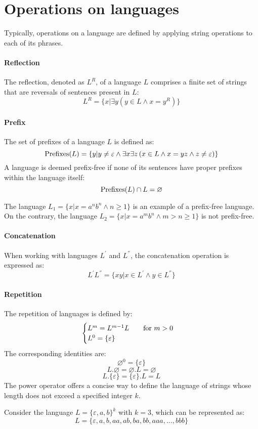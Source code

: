 \section{Operations on languages}

Typically, operations on a language are defined by applying string operations to each of its phrases.

\paragraph*{Reflection}
The reflection, denoted as $L^R$, of a language $L$ comprises a finite set of strings that are reversals of sentences present in $L$:
\[L^R = \{ x | \exists y \left( y \in L \land x=y^R \right)\}\]

\paragraph*{Prefix}  
The set of prefixes of a language $L$ is defined as:
\[\textnormal{Prefixes}(L)=\{y | y \neq \varepsilon \land \exists x \exists z \left( x \in L \land x=yz \land z \neq \varepsilon \right)\}\]
A language is deemed prefix-free if none of its sentences have proper prefixes within the language itself:
\[\textnormal{Prefixes}(L) \cap L = \varnothing\]
\begin{example}
    The language $L_1=\{x|x=a^nb^n \land n \geq 1\}$ is an example of a prefix-free language.
    On the contrary, the language $L_2=\{x|x=a^mb^n \land m > n \geq 1\}$ is not prefix-free. 
\end{example}

\paragraph*{Concatenation}  
When working with languages $L^{'}$ and $L^{''}$, the concatenation operation is expressed as:
\[L^{'}L^{''}=\{ xy | x \in L^{'} \land y \in L^{''} \}\]

\paragraph*{Repetition}  
The repetition of languages is defined by:
\[ \begin{cases}
    L^m=L^{m-1}L \qquad \textnormal{for } m > 0 \\
    L^0=\{ \varepsilon \}
\end{cases}\]
The corresponding identities are:
\[\varnothing ^0 = \{ \varepsilon \} \]
\[L.\varnothing=\varnothing .L=\varnothing \]
\[L.\{\varepsilon\}=\{\varepsilon\} .L=L\]
The power operator offers a concise way to define the language of strings whose length does not exceed a specified integer $k$.
\begin{example}
    Consider the language $L=\{\varepsilon,a,b\}^k$ with $k=3$, which can be represented as:
    \[L=\{\varepsilon,a,b,aa,ab,ba,bb,aaa,\dots,bbb\}\] 
\end{example}


